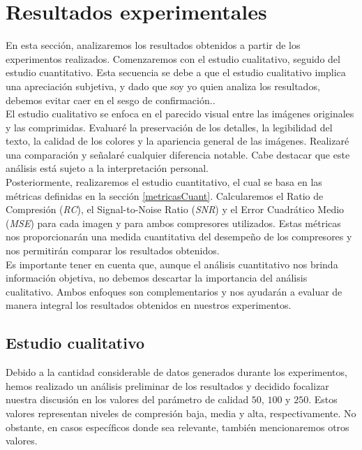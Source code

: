 \documentclass[12pt,a4paper]{article}
\begin{document}
\newpage
\section{Resultados experimentales}
En esta sección, analizaremos los resultados obtenidos a partir de los experimentos realizados. Comenzaremos con el estudio cualitativo, seguido del estudio cuantitativo. Esta secuencia se debe a que el estudio cualitativo implica una apreciación subjetiva, y dado que soy yo quien analiza los resultados, debemos evitar caer en el sesgo de confirmación..\\  

El estudio cualitativo se enfoca en el parecido visual entre las imágenes originales y las comprimidas. Evaluaré la preservación de los detalles, la legibilidad del texto, la calidad de los colores y la apariencia general de las imágenes. Realizaré una comparación y señalaré cualquier diferencia notable. Cabe destacar que este análisis está sujeto a la interpretación personal.\\

Posteriormente, realizaremos el estudio cuantitativo, el cual se basa en las métricas definidas en la sección \ref{metricasCuant}. Calcularemos el Ratio de Compresión (\textit{RC}), el Signal-to-Noise Ratio (\textit{SNR}) y el Error Cuadrático Medio (\textit{MSE}) para cada imagen y para ambos compresores utilizados. Estas métricas nos proporcionarán una medida cuantitativa del desempeño de los compresores y nos permitirán comparar los resultados obtenidos.\\

Es importante tener en cuenta que, aunque el análisis cuantitativo nos brinda información objetiva, no debemos descartar la importancia del análisis cualitativo. Ambos enfoques son complementarios y nos ayudarán a evaluar de manera integral los resultados obtenidos en nuestros experimentos.\\

\subsection{Estudio cualitativo}
Debido a la cantidad considerable de datos generados durante los experimentos, hemos realizado un análisis preliminar de los resultados y decidido focalizar nuestra discusión en los valores del parámetro de calidad $50$, $100$ y $250$. Estos valores representan niveles de compresión baja, media y alta, respectivamente. No obstante, en casos específicos donde sea relevante, también mencionaremos otros valores.\\
\end{document}
